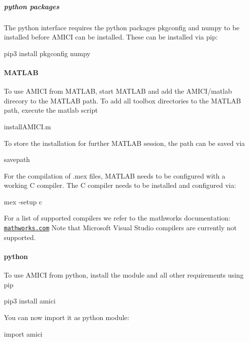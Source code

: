 \subparagraph*{python packages}

The python interface requires the python packages {\ttfamily pkgconfig} and {\ttfamily numpy} to be installed before A\+M\+I\+CI can be installed. These can be installed via {\ttfamily pip}\+: \begin{DoxyVerb}pip3 install pkgconfig numpy
\end{DoxyVerb}


\paragraph*{M\+A\+T\+L\+AB}

To use A\+M\+I\+CI from M\+A\+T\+L\+AB, start M\+A\+T\+L\+AB and add the A\+M\+I\+C\+I/matlab direcory to the M\+A\+T\+L\+AB path. To add all toolbox directories to the M\+A\+T\+L\+AB path, execute the matlab script \begin{DoxyVerb}installAMICI.m
\end{DoxyVerb}


To store the installation for further M\+A\+T\+L\+AB session, the path can be saved via \begin{DoxyVerb}savepath
\end{DoxyVerb}


For the compilation of .mex files, M\+A\+T\+L\+AB needs to be configured with a working C compiler. The C compiler needs to be installed and configured via\+: \begin{DoxyVerb}mex -setup c
\end{DoxyVerb}


For a list of supported compilers we refer to the mathworks documentation\+: \href{http://mathworks.com/support/compilers/R2018b/index.html}{\tt mathworks.\+com} Note that Microsoft Visual Studio compilers are currently not supported.

\paragraph*{python}

To use A\+M\+I\+CI from python, install the module and all other requirements using pip ~\newline
\begin{DoxyVerb}pip3 install amici
\end{DoxyVerb}


You can now import it as python module\+: \begin{DoxyVerb}import amici
\end{DoxyVerb}


